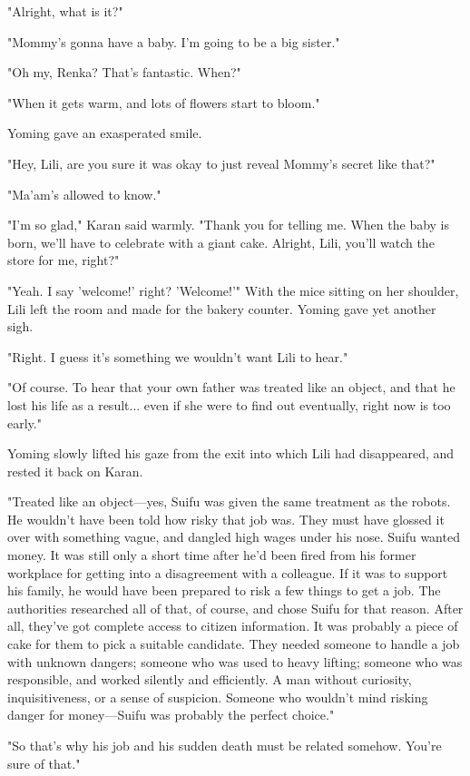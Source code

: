 "Alright, what is it?"

"Mommy's gonna have a baby. I'm going to be a big sister."

"Oh my, Renka? That's fantastic. When?"

"When it gets warm, and lots of flowers start to bloom."

Yoming gave an exasperated smile.

"Hey, Lili, are you sure it was okay to just reveal Mommy's secret like
that?"

"Ma'am's allowed to know."

"I'm so glad," Karan said warmly. "Thank you for telling me. When the
baby is born, we'll have to celebrate with a giant cake. Alright, Lili,
you'll watch the store for me, right?"

"Yeah. I say 'welcome!' right? 'Welcome!'" With the mice sitting on her
shoulder, Lili left the room and made for the bakery counter. Yoming
gave yet another sigh.

"Right. I guess it's something we wouldn't want Lili to hear."

"Of course. To hear that your own father was treated like an object, and
that he lost his life as a result... even if she were to find out
eventually, right now is too early."

Yoming slowly lifted his gaze from the exit into which Lili had
disappeared, and rested it back on Karan.

"Treated like an object---yes, Suifu was given the same treatment as the
robots. He wouldn't have been told how risky that job was. They must
have glossed it over with something vague, and dangled high wages under
his nose. Suifu wanted money. It was still only a short time after he'd
been fired from his former workplace for getting into a disagreement
with a colleague. If it was to support his family, he would have been
prepared to risk a few things to get a job. The authorities researched
all of that, of course, and chose Suifu for that reason. After all,
they've got complete access to citizen information. It was probably a
piece of cake for them to pick a suitable candidate. They needed someone
to handle a job with unknown dangers; someone who was used to heavy
lifting; someone who was responsible, and worked silently and
efficiently. A man without curiosity, inquisitiveness, or a sense of
suspicion. Someone who wouldn't mind risking danger for money---Suifu was
probably the perfect choice."

"So that's why his job and his sudden death must be related somehow.
You're sure of that."

